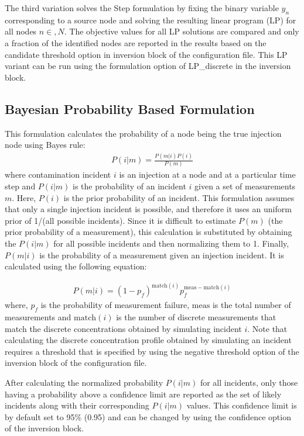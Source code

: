 The third variation solves the Step formulation by fixing the binary
variable $y_n$ corresponding to a source node and solving the
resulting linear program (LP) for all nodes $n \in, N$. The objective
values for all LP solutions are compared and only a fraction of the
identified nodes are reported in the results based on
the candidate threshold option in inversion block of the configuration file. 
This LP variant can be run using the formulation option of
LP\_discrete in the inversion block.

\subsection{Bayesian Probability Based Formulation}
\label{sec.bayesian_algorithm}
This formulation calculates the probability of a node being the true
injection node using Bayes rule:
\begin{align}
P(i|m) = \frac{P(m|i)P(i)}{P(m)} \label{source_probability}
\end{align}
where contamination incident $i$ is an injection at a node and at a particular time step and $P(i|m)$ is 
the probability of an incident $i$ given a set of measurements $m$. Here, $P(i)$ is the 
prior probability of an incident. This formulation assumes that only a single injection 
incident is possible, and therefore it uses an uniform prior of 1/(all possible incidents). 
Since it is difficult to estimate $P(m)$ (the prior probability of a measurement), 
this calculation is substituted by obtaining the $P(i|m)$ for all possible incidents and 
then normalizing them to 1. Finally, $P(m|i)$ is the probability of a measurement 
given an injection incident. It is calculated using the following equation:


\begin{align}
P(m|i) = (1-p_f)^{\mathrm{match}(i)}p_f^{\mathrm{meas} - \mathrm{match}(i)}
\end{align}
where, $p_f$ is the probability of measurement failure, $\mathrm{meas}$ is the total number 
of measurements and $\mathrm{match}(i)$ is the number of discrete measurements that match the discrete concentrations 
obtained by simulating incident $i$. Note that calculating the discrete concentration profile 
obtained by simulating an incident requires a threshold that is specified by using the negative threshold option of the inversion block of the 
 configuration file.

After calculating the normalized probability $P(i|m)$ for all
incidents, only those having a probability above a confidence limit
are reported as the set of likely incidents along with their
corresponding $P(i|m)$ values. This
confidence limit is by default set to 95\% (0.95) and can be changed
by using the confidence option of the inversion block.


